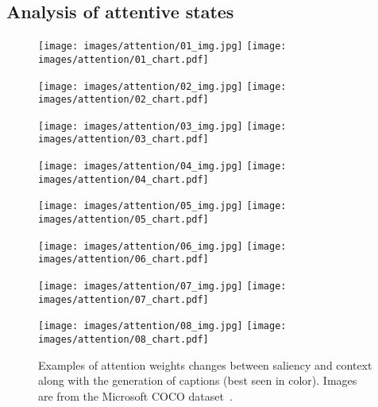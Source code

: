 \subsection{Analysis of attentive states}
\begin{figure}[t]
\begin{center}
    \begin{minipage}[t]{0.48\linewidth}
    \texttt{[image: images/attention/01\_img.jpg]}  
    \texttt{[image: images/attention/01\_chart.pdf]}  
    \end{minipage}
\begin{minipage}[t]{0.48\linewidth}
    \texttt{[image: images/attention/02\_img.jpg]}  
    \texttt{[image: images/attention/02\_chart.pdf]}  
    \end{minipage}
    \begin{minipage}[t]{0.48\linewidth}
    \texttt{[image: images/attention/03\_img.jpg]}  
    \texttt{[image: images/attention/03\_chart.pdf]}  
    \end{minipage}
\begin{minipage}[t]{0.48\linewidth}
    \texttt{[image: images/attention/04\_img.jpg]}  
    \texttt{[image: images/attention/04\_chart.pdf]}  
    \end{minipage}
    \begin{minipage}[t]{0.48\linewidth}
    \texttt{[image: images/attention/05\_img.jpg]}  
    \texttt{[image: images/attention/05\_chart.pdf]}  
    \end{minipage}
\begin{minipage}[t]{0.48\linewidth}
    \texttt{[image: images/attention/06\_img.jpg]}  
    \texttt{[image: images/attention/06\_chart.pdf]}  
    \end{minipage}
    \begin{minipage}[t]{0.48\linewidth}
    \texttt{[image: images/attention/07\_img.jpg]}  
    \texttt{[image: images/attention/07\_chart.pdf]}  
    \end{minipage}
\begin{minipage}[t]{0.48\linewidth}
    \texttt{[image: images/attention/08\_img.jpg]}  
    \texttt{[image: images/attention/08\_chart.pdf]}  
    \end{minipage}
\end{center}
\caption{Examples of attention weights changes between saliency and context along with the generation of captions (best seen in color). Images are from the Microsoft COCO dataset~\cite{lin2014microsoft}.}
\label{fig:attention}
\end{figure}

